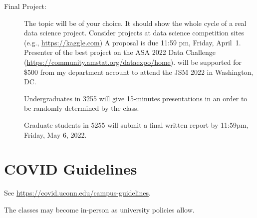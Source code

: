 \documentclass{article}
\begin{document}
\begin{multicols}{2}
\begin{description}
\item[Final Project:]
  The topic will be of your choice. It should show
  the whole cycle of a real data science project. Consider projects at
  data science competition sites (e.g., \url{https://kaggle.com})
  A proposal is due 11:59 pm, Friday, April~1.  Presenter of the best
  project on the ASA 2022 Data Challenge
  (\url{https://community.amstat.org/dataexpo/home}). will be
  supported for \$500
  from my department account to attend the JSM 2022 in Washington,
  DC.\@
  

  Undergraduates in 3255 will give 15-minutes presentations in an
  order to be randomly determined by the class.
  
  Graduate students in 5255 will submit a final written report by
  11:59pm, Friday, May 6, 2022.

\end{description}
\end{multicols}

\section*{COVID Guidelines}
  See \url{https://covid.uconn.edu/campus-guidelines}.

  The classes may become in-person as university policies allow.
\end{document}
